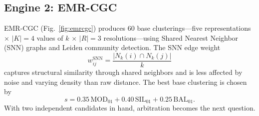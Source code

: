 \documentclass[conference]{IEEEtran}
\begin{document}
\subsection{Engine 2: EMR-CGC}

EMR-CGC (Fig.~\ref{fig:emrcgc}) produces 60 base clusterings---five representations $\times$ $|K|{=}4$ values of $k$ $\times$ $|R|{=}3$ resolutions---using Shared Nearest Neighbor (SNN) graphs and Leiden community detection. The SNN edge weight
\begin{equation}
w_{ij}^{\text{SNN}} = \frac{|N_k(i) \cap N_k(j)|}{k}
\end{equation}
captures structural similarity through shared neighbors and is less affected by noise and varying density than raw distance. The best base clustering is chosen by
\begin{equation}
s = 0.35\,\text{MOD}_{01} + 0.40\,\text{SIL}_{01} + 0.25\,\text{BAL}_{01}.
\end{equation}
With two independent candidates in hand, arbitration becomes the next question.
\end{document}
